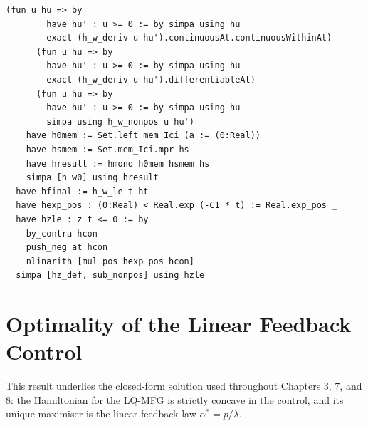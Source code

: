 \begin{lstlisting}[style=lean4, caption={Gronwall's inequality for the differential inequality $y' \le C_1 y + C_2$.}]
      (fun u hu => by
        have hu' : u >= 0 := by simpa using hu
        exact (h_w_deriv u hu').continuousAt.continuousWithinAt)
      (fun u hu => by
        have hu' : u >= 0 := by simpa using hu
        exact (h_w_deriv u hu').differentiableAt)
      (fun u hu => by
        have hu' : u >= 0 := by simpa using hu
        simpa using h_w_nonpos u hu')
    have h0mem := Set.left_mem_Ici (a := (0:Real))
    have hsmem := Set.mem_Ici.mpr hs
    have hresult := hmono h0mem hsmem hs
    simpa [h_w0] using hresult
  have hfinal := h_w_le t ht
  have hexp_pos : (0:Real) < Real.exp (-C1 * t) := Real.exp_pos _
  have hzle : z t <= 0 := by
    by_contra hcon
    push_neg at hcon
    nlinarith [mul_pos hexp_pos hcon]
  simpa [hz_def, sub_nonpos] using hzle
\end{lstlisting}


\section{Optimality of the Linear Feedback Control}
\label{sec:appB-optimal-control}

This result underlies the closed-form solution used throughout Chapters 3, 7, and
8: the Hamiltonian for the LQ-MFG is strictly concave in the control, and its
unique maximiser is the linear feedback law $\alpha^* = p/\lambda$.

